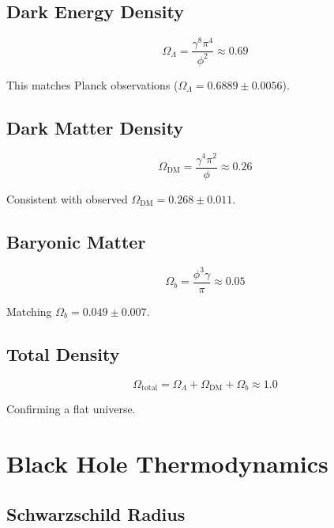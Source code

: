 \documentclass[12pt,a4paper]{article}
\begin{document}
\subsection{Dark Energy Density}

\begin{equation}
\Omega_\Lambda = \frac{\gamma^8 \pi^4}{\phi^2} \approx 0.69
\end{equation}

This matches Planck observations ($\Omega_\Lambda = 0.6889 \pm 0.0056$).

\subsection{Dark Matter Density}

\begin{equation}
\Omega_{\text{DM}} = \frac{\gamma^4 \pi^2}{\phi} \approx 0.26
\end{equation}

Consistent with observed $\Omega_{\text{DM}} = 0.268 \pm 0.011$.

\subsection{Baryonic Matter}

\begin{equation}
\Omega_b = \frac{\phi^3 \gamma}{\pi} \approx 0.05
\end{equation}

Matching $\Omega_b = 0.049 \pm 0.007$.

\subsection{Total Density}

\begin{equation}
\Omega_{\text{total}} = \Omega_\Lambda + \Omega_{\text{DM}} + \Omega_b \approx 1.0
\end{equation}

Confirming a flat universe.

\section{Black Hole Thermodynamics}

\subsection{Schwarzschild Radius}
\end{document}
